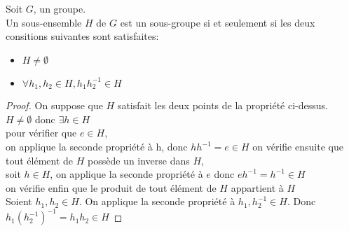 \documentclass[../main.tex]{subfile}
\begin{document}
\begin{ex}
\begin{prop}
	Soit $G$, un groupe.\\
	Un sous-ensemble $H$ de $G$ est un sous-groupe si et seulement si les deux consitions suivantes sont satisfaites:
\begin{itemize}	
	\item $H \neq \emptyset$
	\item $\forall h_1, h_2 \in H, h_1h_2^{-1} \in H$
\end{itemize}
\end{prop}

\begin{proof}
	On suppose que $H$ satisfait les deux points de la propriété ci-dessus.\\
	$H \neq \emptyset$ donc $\exists h \in H$\\
	pour vérifier que $e \in H$, \\
	on applique la seconde propriété à h, donc $hh^{-1} = e \in H$
	on vérifie ensuite que tout élément de $H$ possède un inverse dans $H$, \\
	soit $h \in H$, on applique la seconde propriété à $e$ donc $eh^{-1} = h^{-1} \in H$\\
	on vérifie enfin que le produit de tout élément de $H$ appartient à $H$\\
	Soient $h_1, h_2 \in H$. On applique la seconde propriété à $h_1, h_2^{-1} \in H$. Donc $h_1(h_2^{-1})^{-1} = h_1h_2 \in H$
\end{proof}
\end{ex}
\end{document}
